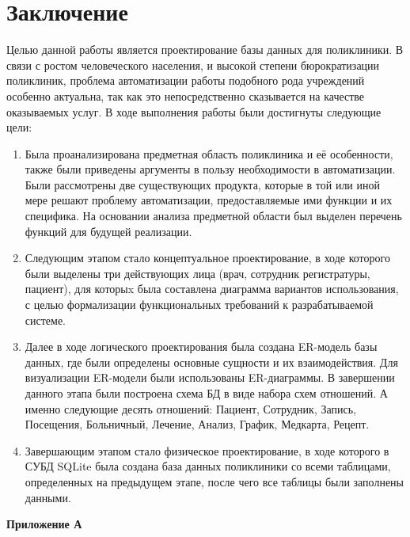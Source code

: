 \documentclass[14pt,a4paper,russian]{extreport}
\begin{document}
\chapter*{Заключение}
Целью данной работы является проектирование базы данных для поликлиники. 
В связи с ростом человеческого населения, и высокой степени бюрократизации поликлиник, проблема
автоматизации работы подобного рода учреждений особенно актуальна, так как это непосредственно
сказывается на качестве оказываемых услуг. В ходе выполнения работы были достигнуты следующие цели: 

\begin{enumerate}[noitemsep]
        \vspace{-5pt}
    \item Была проанализирована предметная область поликлиника и её особенности, также были
        приведены аргументы в пользу необходимости в автоматизации. Были рассмотрены две существующих
        продукта, которые в той или иной мере решают проблему автоматизации, предоставляемые ими
        функции и их специфика. На основании анализа предметной области был выделен перечень
        функций для будущей реализации.
    \item Следующим этапом стало концептуальное проектирование, в ходе которого были выделены
        три 
        действующих лица (врач, сотрудник регистратуры, пациент), для которыx была составлена
        диаграмма вариантов использования, с целью формализации функциональных требований к разрабатываемой системе.
    \item Далее в ходе логического проектирования была создана ER-модель базы данных, где были
        определены основные сущности и их взаимодействия. Для визуализации ER-модели были
        использованы ER-диаграммы. В завершении данного этапа были построена схема БД в виде набора
        схем отношений. А именно следующие десять отношений: Пациент, Сотрудник, Запись, 
		Посещения, Больничный, Лечение, Анализ, График, Медкарта, Рецепт.
    \item Завершающим этапом стало физическое проектирование, в ходе которого в СУБД SQLite была
        создана база данных поликлиники со всеми таблицами, определенных на предыдущем этапе, после
        чего все таблицы были заполнены данными.
\end{enumerate}

{}

\newpage
\hfill\textbf{Приложение А}
\setcounter{figure}{0}
\end{document}
